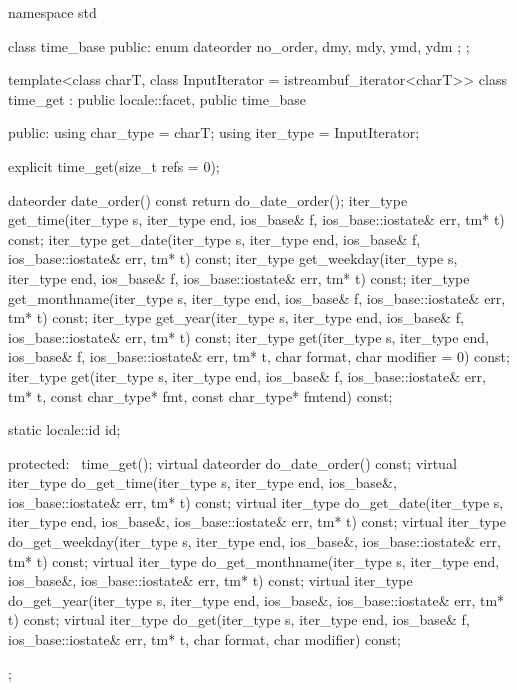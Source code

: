 %
\begin{codeblock}
namespace std {
  class time_base {
  public:
    enum dateorder { no_order, dmy, mdy, ymd, ydm };
  };

  template<class charT, class InputIterator = istreambuf_iterator<charT>>
    class time_get : public locale::facet, public time_base {
    public:
      using char_type = charT;
      using iter_type = InputIterator;

      explicit time_get(size_t refs = 0);

      dateorder date_order()  const { return do_date_order(); }
      iter_type get_time(iter_type s, iter_type end, ios_base& f,
                         ios_base::iostate& err, tm* t)  const;
      iter_type get_date(iter_type s, iter_type end, ios_base& f,
                         ios_base::iostate& err, tm* t)  const;
      iter_type get_weekday(iter_type s, iter_type end, ios_base& f,
                         ios_base::iostate& err, tm* t) const;
      iter_type get_monthname(iter_type s, iter_type end, ios_base& f,
                         ios_base::iostate& err, tm* t) const;
      iter_type get_year(iter_type s, iter_type end, ios_base& f,
                         ios_base::iostate& err, tm* t) const;
      iter_type get(iter_type s, iter_type end, ios_base& f,
                         ios_base::iostate& err, tm* t, char format, char modifier = 0) const;
      iter_type get(iter_type s, iter_type end, ios_base& f,
                         ios_base::iostate& err, tm* t, const char_type* fmt,
                         const char_type* fmtend) const;

      static locale::id id;

    protected:
      ~time_get();
      virtual dateorder do_date_order()  const;
      virtual iter_type do_get_time(iter_type s, iter_type end, ios_base&,
                                    ios_base::iostate& err, tm* t) const;
      virtual iter_type do_get_date(iter_type s, iter_type end, ios_base&,
                                    ios_base::iostate& err, tm* t) const;
      virtual iter_type do_get_weekday(iter_type s, iter_type end, ios_base&,
                                       ios_base::iostate& err, tm* t) const;
      virtual iter_type do_get_monthname(iter_type s, iter_type end, ios_base&,
                                         ios_base::iostate& err, tm* t) const;
      virtual iter_type do_get_year(iter_type s, iter_type end, ios_base&,
                                    ios_base::iostate& err, tm* t) const;
      virtual iter_type do_get(iter_type s, iter_type end, ios_base& f,
                               ios_base::iostate& err, tm* t, char format, char modifier) const;
    };
}
\end{codeblock}

